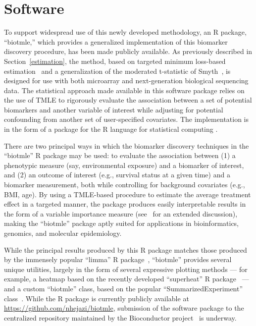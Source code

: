 \chapter{Software}

To support widespread use of this newly developed methodology, an R package,
``biotmle,'' which provides a generalized implementation of this biomarker
discovery procedure, has been made publicly available. As previously described
in Section~\ref{estimation}, the method, based on targeted minimum loss-based
estimation~\cite{van2011targeted} and a generalization of the moderated
t-statistic of Smyth~\cite{smyth2004linear}, is designed for use with both
microarray and next-generation biological sequencing data. The statistical
approach made available in this software package relies on the use of TMLE to
rigorously evaluate the association between a set of potential biomarkers and
another variable of interest while adjusting for potential confounding from
another set of user-specified covariates. The implementation is in the form of a
package for the R language for statistical computing \cite{R}.

There are two principal ways in which the biomarker discovery techniques in
the ``biotmle'' R package may be used: to evaluate the association between (1) a
phenotypic measure (say, environmental exposure) and a biomarker of interest,
and (2) an outcome of interest (e.g., survival status at a given time) and a
biomarker measurement, both while controlling for background covariates (e.g.,
BMI, age). By using a TMLE-based procedure to estimate the average treatment
effect in a targeted manner, the package produces easily interpretable results
in the form of a variable importance measure (see~\cite{van2011targeted} for an
extended discussion), making the ``biotmle'' package aptly suited for
applications in bioinformatics, genomics, and molecular epidemiology.

While the principal results produced by this R package matches those produced by
the immensely popular ``limma'' R package~\cite{smyth2005limma}, ``biotmle''
provides several unique utilities, largely in the form of several expressive
plotting methods --- for example, a heatmap based on the recently developed
``superheat'' R package~\cite{barter2017superheat} --- and a custom ``biotmle''
class, based on the popular ``SummarizedExperiment''
class~\cite{huber2015orchestrating}. While the R package is currently publicly
available at \url{https://github.com/nhejazi/biotmle}, submission of the
software package to the centralized repository maintained by the Bioconductor
project~\cite{gentleman2004bioconductor} is underway.
